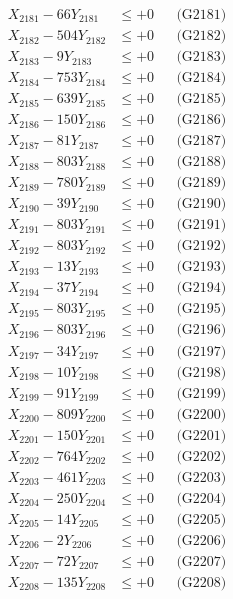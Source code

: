 \documentclass[a4paper,10pt]{article}
\begin{document}
{\begin{align}
\allowbreak
X_{2181} - 66Y_{2181} &\leq +0 && \text{(G2181)} \\
X_{2182} - 504Y_{2182} &\leq +0 && \text{(G2182)} \\
X_{2183} - 9Y_{2183} &\leq +0 && \text{(G2183)} \\
X_{2184} - 753Y_{2184} &\leq +0 && \text{(G2184)} \\
X_{2185} - 639Y_{2185} &\leq +0 && \text{(G2185)} \\
X_{2186} - 150Y_{2186} &\leq +0 && \text{(G2186)} \\
X_{2187} - 81Y_{2187} &\leq +0 && \text{(G2187)} \\
X_{2188} - 803Y_{2188} &\leq +0 && \text{(G2188)} \\
X_{2189} - 780Y_{2189} &\leq +0 && \text{(G2189)} \\
X_{2190} - 39Y_{2190} &\leq +0 && \text{(G2190)} \\
\allowbreak
X_{2191} - 803Y_{2191} &\leq +0 && \text{(G2191)} \\
X_{2192} - 803Y_{2192} &\leq +0 && \text{(G2192)} \\
X_{2193} - 13Y_{2193} &\leq +0 && \text{(G2193)} \\
X_{2194} - 37Y_{2194} &\leq +0 && \text{(G2194)} \\
X_{2195} - 803Y_{2195} &\leq +0 && \text{(G2195)} \\
X_{2196} - 803Y_{2196} &\leq +0 && \text{(G2196)} \\
X_{2197} - 34Y_{2197} &\leq +0 && \text{(G2197)} \\
X_{2198} - 10Y_{2198} &\leq +0 && \text{(G2198)} \\
X_{2199} - 91Y_{2199} &\leq +0 && \text{(G2199)} \\
X_{2200} - 809Y_{2200} &\leq +0 && \text{(G2200)} \\
\allowbreak
X_{2201} - 150Y_{2201} &\leq +0 && \text{(G2201)} \\
X_{2202} - 764Y_{2202} &\leq +0 && \text{(G2202)} \\
X_{2203} - 461Y_{2203} &\leq +0 && \text{(G2203)} \\
X_{2204} - 250Y_{2204} &\leq +0 && \text{(G2204)} \\
X_{2205} - 14Y_{2205} &\leq +0 && \text{(G2205)} \\
X_{2206} - 2Y_{2206} &\leq +0 && \text{(G2206)} \\
X_{2207} - 72Y_{2207} &\leq +0 && \text{(G2207)} \\
X_{2208} - 135Y_{2208} &\leq +0 && \text{(G2208)} \\

\end{align}}
\end{document}
